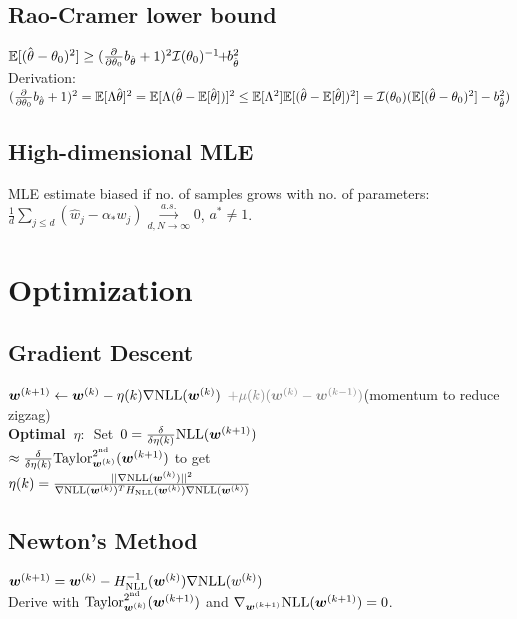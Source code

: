 % 
\subsection*{Rao-Cramer lower bound}    
\mbox{$\mathbb{E}[(\hat{\kern0pt \theta} - \theta_0)^2] \geq (\frac{\partial}{\partial\theta_0}b_{\hat{\kern0pt \theta}}+1)^2\mathcal{I}(\theta_0)^{-1}\!\!+\!\!b_{\hat{\kern0pt \theta}}^2$}\\
Derivation: 
$(\frac{\partial}{\partial\theta_0}b_{\hat{\kern0pt \theta}}+1)^2 = 
 \mathbb{E}[\Lambda\hat{\kern0pt \theta}]^2 = \mathbb{E}[\Lambda(\hat{\kern0pt \theta} - \mathbb{E}[\hat{\kern0pt \theta}])]^2 \leq \mathbb{E}[\Lambda^2]\mathbb{E}[(\hat{\kern0pt \theta}-\mathbb{E}[\hat{\kern0pt \theta}])^2] = \mathcal{I}(\theta_0)(\mathbb{E}[(\hat{\kern0pt \theta} - \theta_0)^2] - b_{\hat{\kern0pt \theta}}^2)
$

\subsection*{High-dimensional MLE}
MLE estimate biased if no. of samples grows with no. of parameters:
$\frac{1}{d}\sum_{j\leq d}(\hat w_j-\alpha_* w_j)\overset{a.s.}{\underset{d,N\to\infty}{\to}}0$, $a^* \neq 1$.

\section*{Optimization}
\subsection*{Gradient Descent}
${\bm{w}}^{(k+1)} \leftarrow {\bm{w}}^{(k)} - \eta(k)\nabla\mathrm{NLL}({\bm{w}}^{(k)})$ {\color{gray}  $\color{gray}+ \mu(k)(\vw^{(k)} - \vw^{(k-1)})$}(momentum to reduce zigzag)\\
\mbox{\textbf{Optimal $\eta:$} Set $0=\frac{\delta}{\delta\eta(k)}\mathrm{NLL}({\bm{w}}^{(k+1)})$}\\$\approx\frac{\delta}{\delta\eta(k)}\mathrm{Taylor}_{{\bm{w}}^{(k)}}^{2^\mathrm{nd}}({\bm{w}}^{(k+1)})$ to get\\
$\eta(k)=\frac{||\nabla\mathrm{NLL}({\bm{w}}^{(k)})||^2}{\nabla\mathrm{NLL}({\bm{w}}^{(k)})^TH_{\mathrm{NLL}}({\bm{w}}^{(k)})\nabla\mathrm{NLL}({\bm{w}}^{(k)})}$

\subsection*{Newton's Method}
\mbox{${\bm{w}}^{(k+1)}={\bm{w}}^{(k)} - H_{\mathrm{NLL}}^{-1}({\bm{w}}^{(k)})\nabla\mathrm{NLL}(w^{(k)})$}\\
Derive with $\mathrm{Taylor}_{{\bm{w}}^{(k)}}^{2^\mathrm{nd}}({\bm{w}}^{(k+1)})$ and $\nabla_{{\bm{w}}^{(k+1)}}\mathrm{NLL}({\bm{w}}^{(k+1)})=0$.